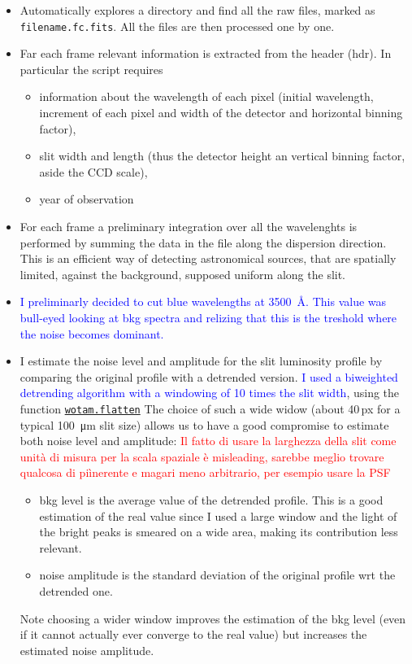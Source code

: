 \documentclass{article}
\newcommand{\arbitrario}[1]{\textcolor{blue}{#1}}
\begin{document}
\begin{itemize}
	\item Automatically explores a directory and find all the raw files, marked as \texttt{filename.fc.fits}. All the files are then processed one by one.
	
	\item Far each frame relevant information is extracted from the header (hdr). In particular the script requires
	\begin{itemize}
		\item information about the wavelength of each pixel (initial wavelength, increment of each pixel and width of the detector and horizontal binning factor),
		\item slit width and length (thus the detector height an vertical binning factor, aside the CCD scale),
		\item year of observation
	\end{itemize}
	\item For each frame a preliminary integration over all the wavelenghts is performed by summing the data in the file along the dispersion direction. This is an efficient way of detecting astronomical sources, that are spatially limited, against the background, supposed uniform along the slit.
	
	\item \arbitrario{I preliminarly decided to cut blue wavelengths at \SI{3500}{\angstrom}. This value was bull-eyed looking at bkg spectra and relizing that this is the treshold where the noise becomes dominant.}
	
	\item I estimate the noise level and amplitude for the slit luminosity profile by comparing the original profile with a detrended version.
	\arbitrario{I used a biweighted detrending algorithm with a windowing of 10 times the slit width}, using the function \href{https://github.com/hippke/wotan}{\texttt{wotam.flatten}}
	The choice of such a wide widow (about 40\,px for a typical \SI{100}{\micro\metre} slit size) allows us to have a good compromise to estimate both noise level and amplitude: \textcolor{red}{Il fatto di usare la larghezza della slit come unit\`a di misura per la scala spaziale \`e misleading, sarebbe meglio trovare qualcosa di pi\` inerente e magari meno arbitrario, per esempio usare la PSF}
	\begin{itemize}
		\item bkg level is the average value of the detrended profile. This is a good estimation of the real value since I used a large window and the light of the bright peaks is smeared on a wide area, making its contribution less relevant.
		\item noise amplitude is the standard deviation of the original profile wrt the detrended one.
	\end{itemize}
	Note choosing a wider window improves the estimation of the bkg level (even if it cannot actually ever converge to the real value) but increases the estimated noise amplitude.
	

\end{itemize}
\end{document}

